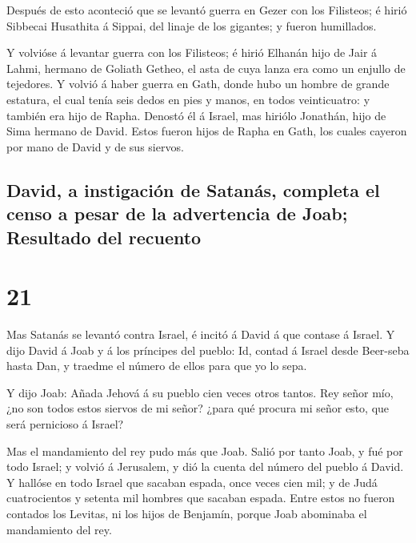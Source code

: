  Después de esto aconteció que se levantó guerra en Gezer
con los Filisteos; é hirió Sibbecai Husathita á Sippai, del linaje de
los gigantes; y fueron humillados.

 Y volvióse á levantar guerra con los Filisteos; é hirió
Elhanán hijo de Jair á Lahmi, hermano de Goliath Getheo, el asta de cuya
lanza era como un enjullo de tejedores.  Y volvió á haber
guerra en Gath, donde hubo un hombre de grande estatura, el cual tenía
seis dedos en pies y manos, en todos veinticuatro: y también era hijo de
Rapha.  Denostó él á Israel, mas hiriólo Jonathán, hijo de
Sima hermano de David.  Estos fueron hijos de Rapha en Gath,
los cuales cayeron por mano de David y de sus siervos.

\hypertarget{david-a-instigaciuxf3n-de-satanuxe1s-completa-el-censo-a-pesar-de-la-advertencia-de-joab-resultado-del-recuento}{%
\subsection{David, a instigación de Satanás, completa el censo a pesar
de la advertencia de Joab; Resultado del
recuento}\label{david-a-instigaciuxf3n-de-satanuxe1s-completa-el-censo-a-pesar-de-la-advertencia-de-joab-resultado-del-recuento}}

\hypertarget{section-20}{%
\section{21}\label{section-20}}

 Mas Satanás se levantó contra Israel, é incitó á David á
que contase á Israel.  Y dijo David á Joab y á los príncipes
del pueblo: Id, contad á Israel desde Beer-seba hasta Dan, y traedme el
número de ellos para que yo lo sepa.

 Y dijo Joab: Añada Jehová á su pueblo cien veces otros
tantos. Rey señor mío, ¿no son todos estos siervos de mi señor? ¿para
qué procura mi señor esto, que será pernicioso á Israel?

 Mas el mandamiento del rey pudo más que Joab. Salió por
tanto Joab, y fué por todo Israel; y volvió á Jerusalem, y dió la cuenta
del número del pueblo á David.  Y hallóse en todo Israel que
sacaban espada, once veces cien mil; y de Judá cuatrocientos y setenta
mil hombres que sacaban espada.  Entre estos no fueron
contados los Levitas, ni los hijos de Benjamín, porque Joab abominaba el
mandamiento del rey.

